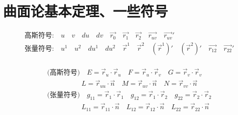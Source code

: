 \documentclass[lang=cn,10pt,thmcnt=section]{elegantbook}
\begin{document}
\section{曲面论基本定理、一些符号}
\begin{align*}
    &\text{高斯符号:} \quad u \quad v \quad du \quad dv \quad \vec{r_0} \quad \vec{r_1} \quad \vec{r_2} \quad \vec{r_{uv}} \quad \vec{r_{uv}}' \\
    &\text{张量符号:} \quad u^1 \quad u^2 \quad du^1 \quad du^2 \quad \vec{r}^1 \quad \vec{r}^2 \quad (\vec{r}^1)' \quad (\vec{r}^2)' \quad \vec{r_{12}} \quad \vec{r_{22}}' \\
\end{align*}

\begin{align*}
    &\text{(高斯符号)} \quad E = \vec{r}_u \cdot \vec{r}_u \quad F = \vec{r}_u \cdot \vec{r}_v \quad G = \vec{r}_v \cdot \vec{r}_v \\
    &\quad \quad \quad \quad \quad L = \vec{r}_{uu} \cdot \vec{n} \quad M = \vec{r}_{uv} \cdot \vec{n} \quad N = \vec{r}_{vv} \cdot \vec{n} \\
    &\text{(张量符号)} \quad g_{11} = \vec{r}_1 \cdot \vec{r}_1 \quad g_{12} = \vec{r}_1 \cdot \vec{r}_2 \quad g_{22} = \vec{r}_2 \cdot \vec{r}_2 \\
    &\quad \quad \quad \quad \quad L_{11} = \vec{r}_{11} \cdot \vec{n} \quad L_{12} = \vec{r}_{12} \cdot \vec{n} \quad L_{22} = \vec{r}_{22} \cdot \vec{n} \\
\end{align*}
\end{document}
